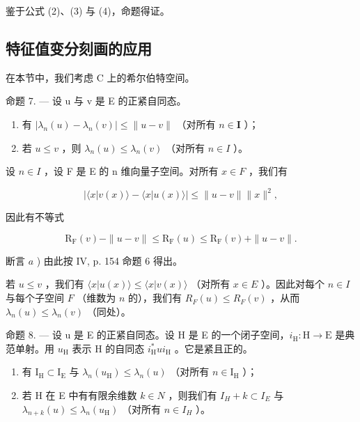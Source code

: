 鉴于公式 (2)、(3) 与 (4)，命题得证。

\subsection{特征值变分刻画的应用}

在本节中，我们考虑 C 上的希尔伯特空间。

命题 7. --- 设 u 与 v 是 E 的正紧自同态。

\begin{enumerate}
\def\labelenumi{\alph{enumi})}
\item
  有 \(|\lambda_n(u) - \lambda_n(v)|\leqslant \| u - v\|\) （对所有 \(n\in \mathbf{I}\) ）；
\item
  若 \(u \leqslant v\) ，则 \(\lambda_n(u) \leqslant \lambda_n(v)\) （对所有 \(n \in I\) ）。
\end{enumerate}

设 \(n \in I\) ，设 F 是 E 的 n 维向量子空间。对所有 \(x \in F\) ，我们有

\[
| \langle x | v (x) \rangle - \langle x | u (x) \rangle | \leqslant \| u - v \| \| x \| ^ {2},
\]

因此有不等式

\[
\mathrm{R} _ {\mathrm{F}} (v) - \| u - v \| \leqslant \mathrm{R} _ {\mathrm{F}} (u) \leqslant \mathrm{R} _ {\mathrm{F}} (v) + \| u - v \|.
\]

断言 \(a\) ) 由此按 IV, p. 154 命题 6 得出。

若 \(u \leqslant v\) ，我们有 \(\langle x | u(x) \rangle \leqslant \langle x | v(x) \rangle\) （对所有 \(x \in E\) ）。因此对每个 \(n \in I\) 与每个子空间 \(F\) （维数为 \(n\) 的），我们有 \(R_F(u) \leqslant R_F(v)\) ，从而 \(\lambda_n(u) \leqslant \lambda_n(v)\) （同处）。

命题 8. --- 设 u 是 E 的正紧自同态。设 H 是 E 的一个闭子空间，\(i_{\mathrm{H}}: \mathrm{H} \to \mathrm{E}\) 是典范单射。用 \(u_{\mathrm{H}}\) 表示 H 的自同态 \(i_{\mathrm{H}}^{*}ui_{\mathrm{H}}\) 。它是紧且正的。

\begin{enumerate}
\def\labelenumi{\alph{enumi})}
\item
  有 \(\mathrm{I_H}\subset \mathrm{I_E}\) 与 \(\lambda_n(u_{\mathrm{H}})\leqslant \lambda_n(u)\) （对所有 \(n\in \mathrm{I_H}\) ）；
\item
  若 H 在 E 中有有限余维数 \(k \in N\) ，则我们有 \(I_{H} + k \subset I_{E}\) 与 \(\lambda_{n+k}(u) \leqslant \lambda_{n}(u_{\mathrm{H}})\) （对所有 \(n \in I_{H}\) ）。
\end{enumerate}

